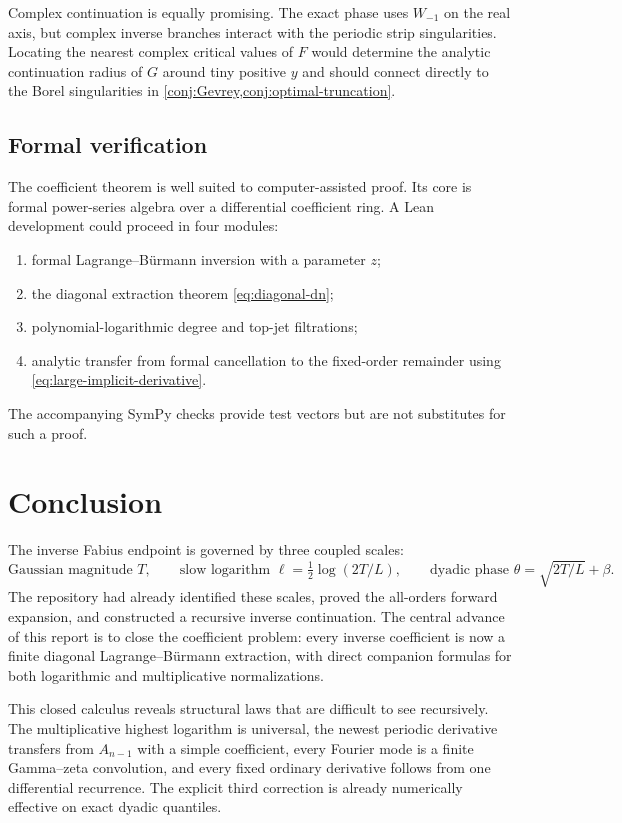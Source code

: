 \documentclass[11pt,oneside]{article}
\numberwithin{equation}{section}
\theoremstyle{definition}
\theoremstyle{remark}
\begin{document}
Complex continuation is equally promising.  The exact phase uses $W_{-1}$ on the real axis, but complex inverse branches interact with the periodic strip singularities.  Locating the nearest complex critical values of $F$ would determine the analytic continuation radius of $G$ around tiny positive $y$ and should connect directly to the Borel singularities in \cref{conj:Gevrey,conj:optimal-truncation}.

\subsection{Formal verification}
The coefficient theorem is well suited to computer-assisted proof.  Its core is formal power-series algebra over a differential coefficient ring.  A Lean development could proceed in four modules:
\begin{enumerate}
\item formal Lagrange--B\"urmann inversion with a parameter $z$;
\item the diagonal extraction theorem \cref{eq:diagonal-dn};
\item polynomial-logarithmic degree and top-jet filtrations;
\item analytic transfer from formal cancellation to the fixed-order remainder using \cref{eq:large-implicit-derivative}.
\end{enumerate}
The accompanying SymPy checks provide test vectors but are not substitutes for such a proof.

\section{Conclusion}
\label{sec:conclusion}

The inverse Fabius endpoint is governed by three coupled scales:
\begin{equation}
 \text{Gaussian magnitude }T,
 \qquad
 \text{slow logarithm }\ell=\tfrac12\log(2T/L),
 \qquad
 \text{dyadic phase }\theta=\sqrt{2T/L}+\beta.
\end{equation}
The repository had already identified these scales, proved the all-orders forward expansion, and constructed a recursive inverse continuation.  The central advance of this report is to close the coefficient problem: every inverse coefficient is now a finite diagonal Lagrange--B\"urmann extraction, with direct companion formulas for both logarithmic and multiplicative normalizations.

This closed calculus reveals structural laws that are difficult to see recursively.  The multiplicative highest logarithm is universal, the newest periodic derivative transfers from $A_{n-1}$ with a simple coefficient, every Fourier mode is a finite Gamma--zeta convolution, and every fixed ordinary derivative follows from one differential recurrence.  The explicit third correction is already numerically effective on exact dyadic quantiles.
\end{document}
